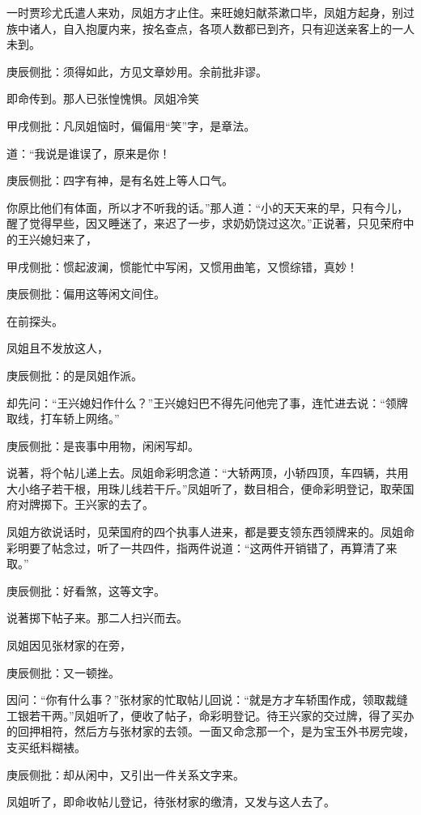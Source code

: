 \begin{parag}


    一时贾珍尤氏遣人来劝，凤姐方才止住。来旺媳妇献茶漱口毕，凤姐方起身，别过族中诸人，自入抱厦内来，按名查点，各项人数都已到齐，只有迎送亲客上的一人未到。\begin{note}庚辰侧批：须得如此，方见文章妙用。余前批非谬。\end{note}即命传到。那人已张惶愧惧。凤姐冷笑\begin{note}甲戌侧批：凡凤姐恼时，偏偏用“笑”字，是章法。\end{note}道：“我说是谁误了，原来是你！\begin{note}庚辰侧批：四字有神，是有名姓上等人口气。\end{note}你原比他们有体面，所以才不听我的话。”那人道：“小的天天来的早，只有今儿，醒了觉得早些，因又睡迷了，来迟了一步，求奶奶饶过这次。”正说著，只见荣府中的王兴媳妇来了，\begin{note}甲戌侧批：惯起波澜，惯能忙中写闲，又惯用曲笔，又惯综错，真妙！\end{note}\begin{note}庚辰侧批：偏用这等闲文间住。\end{note}在前探头。
\end{parag}


\begin{parag}


    凤姐且不发放这人，\begin{note}庚辰侧批：的是凤姐作派。\end{note}却先问：“王兴媳妇作什么？”王兴媳妇巴不得先问他完了事，连忙进去说：“领牌取线，打车轿上网络。”\begin{note}庚辰侧批：是丧事中用物，闲闲写却。\end{note}说著，将个帖儿递上去。凤姐命彩明念道：“大轿两顶，小轿四顶，车四辆，共用大小络子若干根，用珠儿线若干斤。”凤姐听了，数目相合，便命彩明登记，取荣国府对牌掷下。王兴家的去了。
\end{parag}


\begin{parag}


    凤姐方欲说话时，见荣国府的四个执事人进来，都是要支领东西领牌来的。凤姐命彩明要了帖念过，听了一共四件，指两件说道：“这两件开销错了，再算清了来取。”\begin{note}庚辰侧批：好看煞，这等文字。\end{note}说著掷下帖子来。那二人扫兴而去。
\end{parag}


\begin{parag}


    凤姐因见张材家的在旁，\begin{note}庚辰侧批：又一顿挫。\end{note}因问：“你有什么事？”张材家的忙取帖儿回说：“就是方才车轿围作成，领取裁缝工银若干两。”凤姐听了，便收了帖子，命彩明登记。待王兴家的交过牌，得了买办的回押相符，然后方与张材家的去领。一面又命念那一个，是为宝玉外书房完竣，支买纸料糊裱。\begin{note}庚辰侧批：却从闲中，又引出一件关系文字来。\end{note}凤姐听了，即命收帖儿登记，待张材家的缴清，又发与这人去了。
\end{parag}


